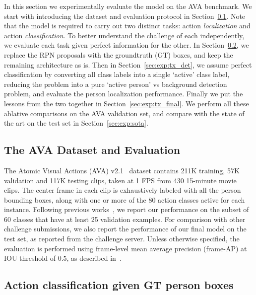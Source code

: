 \documentclass[10pt,twocolumn,letterpaper]{article}
\begin{document}
In this section we experimentally evaluate the model on the AVA
benchmark. We start with introducing the dataset and evaluation
protocol in Section~\ref{sec:exp:data}.  Note that the model is
required to carry out two distinct tasks: action {\em localization}
and action {\em classification}. To better understand the challenge of  each independently,
we evaluate each task given perfect
information for the other. In Section~\ref{sec:exp:tx_gt}, we
replace  the RPN proposals with the groundtruth (GT) boxes,   and keep
the remaining architecture as is.  Then in
Section~\ref{sec:exp:tx_det}, we assume perfect classification  by
converting all class labels into a single `active' class label,
reducing the problem into a pure `active person' vs background
detection problem, and evaluate the person
localization performance. Finally we put the lessons from the two together
in Section~\ref{sec:exp:tx_final}. 
We perform all these ablative comparisons on the AVA validation set,
and compare with the state of the art on the test set in Section~\ref{sec:exp:sota}.


\subsection{The AVA Dataset and Evaluation}\label{sec:exp:data}
The Atomic Visual Actions (AVA)
v2.1~\cite{gu2018ava} dataset contains 211K training, 57K
validation and 117K testing clips, taken at 1 FPS from 430 15-minute
movie clips. The center frame in each clip is exhaustively labeled
with all the person bounding boxes, along with one or more of the 80
action classes active for each instance. Following previous
works~\cite{gu2018ava,sun2018arcn}, we report our performance on the
subset of 60 classes that have at least 25 validation examples.  For
comparison with other challenge submissions, we also report the
performance of our final model on the test set, as reported from the
challenge server.  Unless otherwise specified, the evaluation is
performed using frame-level mean average precision (frame-AP) at IOU
threshold of 0.5, as described in~\cite{gu2018ava}.


\subsection{Action classification given GT person boxes}\label{sec:exp:tx_gt}
\end{document}
